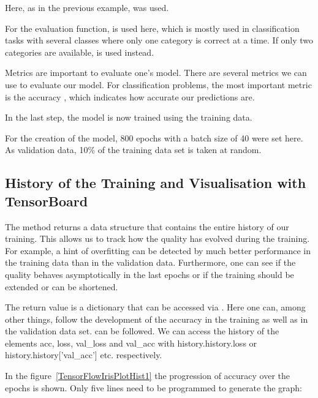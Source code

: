 \medskip

Here, as in the previous example,  was used.

For the evaluation function,  is used here, which is mostly used in classification tasks with several classes where only one category is correct at a time. If only two categories are available,  is used instead.

Metrics are important to evaluate one's model. There are several metrics we can use to evaluate our model. For classification problems, the most important metric is the accuracy \PYTHON{['acc']}, which indicates how accurate our predictions are.

In the last step, the model is now trained using the training data.

\medskip


\medskip

For the creation of the model, 800 epochs with a batch size of 40 were set here. As validation data, 10\% of the training data set is taken at random.

\subsection{History of the Training and Visualisation with TensorBoard}

The  method returns a data structure that contains the entire history of our training. This allows us to track how the quality has evolved during the training. For example, a hint of overfitting can be detected by much better performance in the training data than in the validation data. Furthermore, one can see if the quality behaves asymptotically in the last epochs or if the training should be extended or can be shortened.

The return value is a dictionary that can be accessed via .
Here one can, among other things, follow the development of the accuracy in the training as well as in the validation data set.
can be followed. We can access the history of the elements acc, loss, val\_loss and val\_acc with history.history.loss or history.history['val\_acc'] etc. respectively.


In the figure~\ref{TensorFlowIrisPlotHist1} the progression of accuracy over the epochs is shown. Only five lines need to be programmed to generate the graph:

